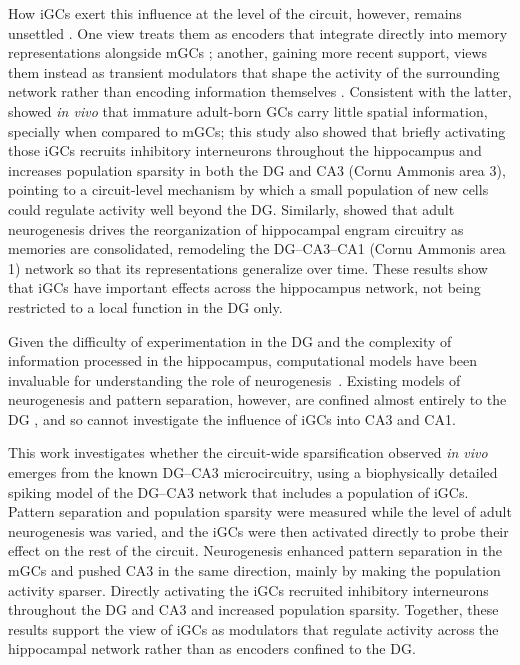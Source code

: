 \documentclass[pdflatex,sn-basic]{sn-jnl}%
\theoremstyle{thmstyleone}%
\theoremstyle{thmstyletwo}%
\theoremstyle{thmstylethree}%
\begin{document}
How iGCs exert this influence at the level of the circuit, however, remains unsettled \citep{berdugo-vegaSharpening2023}. One view
treats them as encoders that integrate directly into memory representations alongside mGCs \citep{piattiNeurogenesis2013};
another, gaining more recent support, views them instead as transient modulators that shape the activity of the surrounding
network rather than encoding information themselves \citep{aimoneComputational2016, folszAdultborn2023}. Consistent with the
latter, \citet{mchughAdultborn2022} showed \textit{in vivo} that immature adult-born GCs carry little spatial information,
specially when compared to mGCs; this study also showed that briefly activating those iGCs recruits inhibitory interneurons
throughout the hippocampus and increases population sparsity in both the DG and CA3 (Cornu Ammonis area 3), pointing to a
circuit-level mechanism by which a small population of new cells could regulate activity well beyond the DG\@. Similarly,
\citet{koSystems2025} showed that adult neurogenesis drives the reorganization of hippocampal engram circuitry as memories are
consolidated, remodeling the DG--CA3--CA1 (Cornu Ammonis area 1) network so that its representations generalize over time. These
results show that iGCs have important effects across the hippocampus network, not being restricted to a local function in the DG
only.

Given the difficulty of experimentation in the DG and the complexity of information processed in the hippocampus, computational
models have been invaluable for understanding the role of neurogenesis~\citep{aimoneComputational2016}. Existing models of
neurogenesis and pattern separation, however, are confined almost entirely to the DG \citep{chavlisDendrites2017, kimEffect2024,
yangDynamic2025}, and so cannot investigate the influence of iGCs into CA3 and CA1.

This work investigates whether the circuit-wide sparsification observed \textit{in vivo} emerges from the known DG--CA3
microcircuitry, using a biophysically detailed spiking model of the DG--CA3 network that includes a population of iGCs.
Pattern separation and population sparsity were measured while the level of adult neurogenesis was varied, and the iGCs
were then activated directly to probe their effect on the rest of the circuit. Neurogenesis enhanced pattern separation in the
mGCs and pushed CA3 in the same direction, mainly by making the population activity sparser. Directly activating
the iGCs recruited inhibitory interneurons throughout the DG and CA3 and increased population sparsity. Together, these results
support the view of iGCs as modulators that regulate activity across the hippocampal network rather than as
encoders confined to the DG\@.
\end{document}
